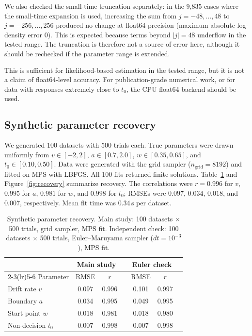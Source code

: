 \documentclass[11pt]{article}
\begin{document}
We also checked the small-time truncation separately: in the 9,835 cases where the small-time expansion is used, increasing the sum from $j=-48,\ldots,48$ to $j=-256,\ldots,256$ produced no change at float64 precision (maximum absolute log-density error 0). This is expected because terms beyond $|j|=48$ underflow in the tested range. The truncation is therefore not a source of error here, although it should be rechecked if the parameter range is extended.

This is sufficient for likelihood-based estimation in the tested range, but it is not a claim of float64-level accuracy. For publication-grade numerical work, or for data with responses extremely close to $t_0$, the CPU float64 backend should be used.

\subsection{Synthetic parameter recovery}

We generated 100 datasets with 500 trials each. True parameters were drawn uniformly from $v\in[-2,2]$, $a\in[0.7,2.0]$, $w\in[0.35,0.65]$, and $t_0\in[0.10,0.50]$. Data were generated with the grid sampler ($n_{\mathrm{grid}}=8192$) and fitted on MPS with LBFGS. All 100 fits returned finite solutions. Table~\ref{tab:recovery} and Figure~\ref{fig:recovery} summarize recovery. The correlations were $r=0.996$ for $v$, $0.995$ for $a$, $0.981$ for $w$, and $0.998$ for $t_0$; RMSEs were $0.097$, $0.034$, $0.018$, and $0.007$, respectively. Mean fit time was 0.34\,s per dataset.

\begin{table}[H]
\centering
\caption{Synthetic parameter recovery. Main study: 100 datasets $\times$ 500 trials, grid sampler, MPS fit. Independent check: 100 datasets $\times$ 500 trials, Euler--Maruyama sampler ($dt=10^{-3}$), MPS fit.}
\label{tab:recovery}
\begin{tabular}{lcccccc}
\toprule
 & \multicolumn{2}{c}{Main study} & & \multicolumn{2}{c}{Euler check} & \\
\cmidrule(lr){2-3}\cmidrule(lr){5-6}
Parameter & RMSE & $r$ & & RMSE & $r$ & \\
\midrule
Drift rate $v$ & 0.097 & 0.996 & & 0.101 & 0.997 & \\
Boundary $a$ & 0.034 & 0.995 & & 0.049 & 0.995 & \\
Start point $w$ & 0.018 & 0.981 & & 0.018 & 0.980 & \\
Non-decision $t_0$ & 0.007 & 0.998 & & 0.007 & 0.998 & \\
\bottomrule
\end{tabular}
\end{table}
\end{document}

